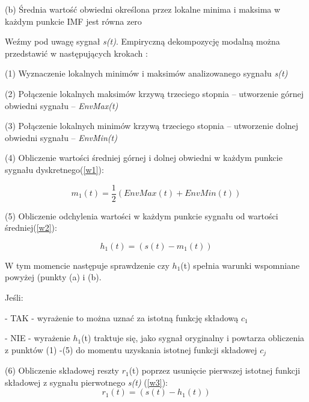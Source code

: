 \documentclass[10pt,a4paper]{article}
\begin{document}
 \vspace{1em} 

(b) Średnia wartość obwiedni określona przez lokalne minima i maksima w każdym
punkcie IMF jest równa zero

\vspace{2em}

Weźmy pod uwagę sygnał \textit{s(t)}. Empiryczną dekompozycję modalną można przedstawić w
następujących krokach \cite{dwa} \cite{trzy} \cite{cztery}:

 \vspace{1em} 
 
(1) Wyznaczenie lokalnych minimów i maksimów analizowanego sygnału \textit{s(t)}

(2) Połączenie lokalnych maksimów krzywą trzeciego stopnia – utworzenie górnej
obwiedni sygnału – \textit{EnvMax(t)}

(3) Połączenie lokalnych minimów krzywą trzeciego stopnia – utworzenie dolnej obwiedni
sygnału – \textit{EnvMin(t)}

(4) Obliczenie wartości średniej górnej i dolnej obwiedni w każdym punkcie sygnału
dyskretnego(\ref{w1}):

 \vspace{1em} 
 
\begin{equation}
m_1(t) = \frac{1}{2}(EnvMax(t) + EnvMin(t))
\label{w1}
\end{equation}

(5) Obliczenie odchylenia wartości w każdym punkcie sygnału od wartości średniej(\ref{w2}):

\begin{equation}
h_1(t) = (s(t) - m_1(t))
\label{w2}
\end{equation}

W tym momencie następuje sprawdzenie czy $h_1$(t) spełnia warunki wspomniane powyżej
(punkty (a) i (b).

\vspace{0.5em}

Jeśli:

\vspace{0.5em}

- TAK - wyrażenie to można uznać za istotną funkcję składową $c_1$

- NIE - wyrażenie $h_1$(t) traktuje się, jako sygnał oryginalny i powtarza obliczenia z punktów (1) -(5) do momentu uzyskania istotnej funkcji składowej $c_j$

(6) Obliczenie składowej reszty $r_1$(t) poprzez usunięcie pierwszej istotnej funkcji
składowej z sygnału pierwotnego \textit{s(t)} (\ref{w3}):
\begin{equation}
r_1(t) = (s(t) - h_1(t))
\label{w3}
\end{equation}
\end{document}
